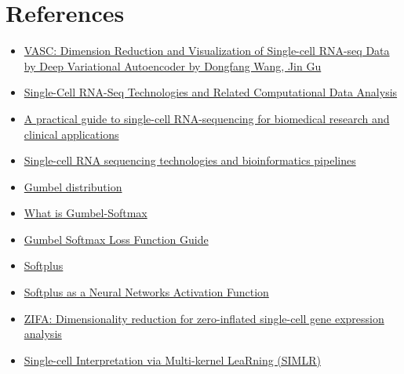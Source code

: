 \documentclass[12 pts]{article}
\begin{document}
\section{References}
\begin{itemize}

\item \href{https://www.sciencedirect.com/science/article/pii/S167202291830439X}{VASC: Dimension Reduction and Visualization of Single-cell RNA-seq Data by Deep Variational Autoencoder by Dongfang Wang, Jin Gu}

\item \href{https://www.frontiersin.org/articles/10.3389/fgene.2019.00317/full}{Single-Cell RNA-Seq Technologies and Related Computational Data Analysis}

\item \href{https://genomemedicine.biomedcentral.com/articles/10.1186/s13073-017-0467-4}{A practical guide to single-cell RNA-sequencing for biomedical research and clinical applications}

\item \href{nature.com/articles/s12276-018-0071-8}{Single-cell RNA sequencing technologies and bioinformatics pipelines}

\item \href{https://en.wikipedia.org/wiki/Gumbel_distribution}{Gumbel distribution}

\item \href{https://towardsdatascience.com/what-is-gumbel-softmax-7f6d9cdcb90e}{What is Gumbel-Softmax}

\item \href{https://neptune.ai/blog/gumbel-softmax-loss-function-guide-how-to-implement-it-in-pytorch}{Gumbel Softmax Loss Function Guide}

\item \href{https://paperswithcode.com/method/softplus}{Softplus}

\item \href{https://sefiks.com/2017/08/11/softplus-as-a-neural-networks-activation-function/}{Softplus as a Neural Networks Activation Function}

\item \href{https://genomebiology.biomedcentral.com/articles/10.1186/s13059-015-0805-z}{ZIFA: Dimensionality reduction for zero-inflated single-cell gene expression analysis}

\item \href{https://bioconductor.org/packages/devel/bioc/vignettes/SIMLR/inst/doc/vignette.pdf}{Single-cell Interpretation via Multi-kernel LeaRning (SIMLR)}


\end{itemize}
\end{document}
